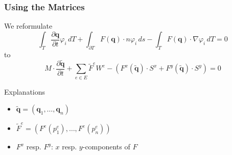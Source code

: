 \documentclass{beamer}
\newcommand{\pd}[2]{\dfrac{\partial #1}{\partial #2}}
\renewcommand{\phi}{\varphi}
\begin{document}
\begin{frame}
  \frametitle{Using the Matrices}
  We reformulate
  \begin{equation*}
    \int_T \pd {\mathbf{q}}{t} \phi_i \, dT +
    \int_{\partial T} F(\mathbf{q}) \cdot n \phi_i \, ds -
    \int_T F(\mathbf{q}) \cdot \nabla \phi_i \, dT = 0
  \end{equation*}
  to
  \begin{equation*}
    M \cdot \pd{\tilde{\mathbf{q}}}{t} +
    \sum_{e \in E} \tilde{F}^e W^e -
    \left(F^x(\tilde{\mathbf{q}}) \cdot S^x +
      F^y(\tilde{\mathbf{q}}) \cdot S^y\right) = 0
  \end{equation*}
  \begin{block}{Explanations}
    \begin{itemize}
    \item $\tilde{\mathbf{q}} = (\mathbf{q}_1,\dots,\mathbf{q}_n)$
    \item $\tilde{F}^e=(F^e(p_1^e),\dots,F^e(p_n^e))$
    \item $F^x$ resp. $F^y$: $x$ resp. $y$-components of $F$
    \end{itemize}
  \end{block}
\end{frame}

\end{document}
